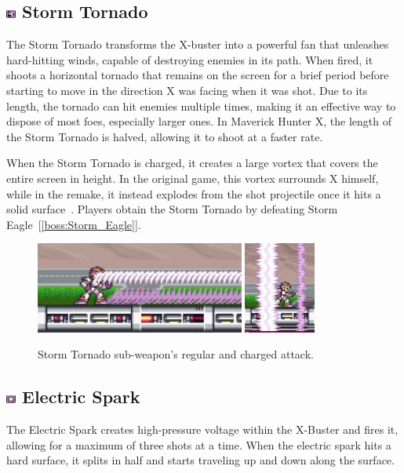 \subsection{\includegraphics[width=12px, height=10px]{figures/X1/weapons/Storm_T.jpg} Storm Tornado}\label{Storm_tornado}

The Storm Tornado transforms the X-buster into a powerful fan that unleashes hard-hitting winds, capable of destroying enemies in its path. When fired, it shoots a horizontal tornado that remains on the screen for a brief period before starting to move in the direction X was facing when it was shot. Due to its length, the tornado can hit enemies multiple times, making it an effective way to dispose of most foes, especially larger ones. In Maverick Hunter X, the length of the Storm Tornado is halved, allowing it to shoot at a faster rate.

When the Storm Tornado is charged, it creates a large vortex that covers the entire screen in height. In the original game, this vortex surrounds X himself, while in the remake, it instead explodes from the shot projectile once it hits a solid surface~\cite{wiki:Storm_tornado}. Players obtain the Storm Tornado by defeating Storm Eagle~[\ref{boss:Storm_Eagle}]. 
\begin{figure}[htp]
	\centering
		\includegraphics[height=3cm]{figures/X1/weapons/Storm_tornado_1.jpg}
		\includegraphics[height=3cm]{figures/X1/weapons/Storm_tornado_2.jpg}
	\caption{Storm Tornado sub-weapon's regular and charged attack.}
\end{figure}

\subsection{\includegraphics[width=12px, height=10px]{figures/X1/weapons/E_Spark.jpg} Electric Spark}\label{Electric_spark}
The Electric Spark creates high-pressure voltage within the X-Buster and fires it, allowing for a maximum of three shots at a time. When the electric spark hits a hard surface, it splits in half and starts traveling up and down along the surface.

